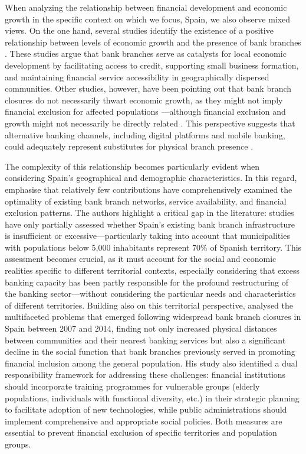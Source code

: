 \documentclass[a4paper,11pt,oneside]{article}
\begin{document}
When analyzing the relationship between financial development and economic growth in the specific context on which we focus, Spain, we also observe mixed views. On the one hand, several studies identify the existence of a positive relationship between levels of economic growth and the presence of bank branches  \citep[see, for instance,][]{olit2011exclusion,fernandez2019banks,alonso2020dinamicas}. These studies argue that bank branches serve as catalysts for local economic development by facilitating access to credit, supporting small business formation, and maintaining financial service accessibility in geographically dispersed communities. Other studies, however, have been pointing out that bank branch closures do not necessarily thwart economic growth, as they might not imply financial exclusion for affected populations \citep{maudos2017bank,jimenez2018cierre,garcia2021}---although financial exclusion and growth might not necessarily be directly related \citep{koku2015financial}. This perspective suggests that alternative banking channels, including digital platforms and mobile banking, could adequately represent substitutes for physical branch presence \citep{philippon2019fintech}.




The complexity of this relationship becomes particularly evident when considering Spain's geographical and demographic characteristics. In this regard, \cite{alama_conesa_forte_tortosa_jas} emphasise that relatively few contributions have comprehensively examined the optimality of existing bank branch networks, service availability, and financial exclusion patterns. The authors highlight a critical gap in the literature: studies have only partially assessed whether Spain's existing bank branch infrastructure is insufficient or excessive---particularly taking into account that municipalities with populations below 5,000 inhabitants represent 70\% of Spanish territory. This assessment becomes crucial, as it must account for the social and economic realities specific to different territorial contexts, especially considering that excess banking capacity has been partly responsible for the profound restructuring of the banking sector---without considering the particular needs and characteristics of different territories. Building also on this territorial perspective, \cite{martin2019financial} analysed the multifaceted problems that emerged following widespread bank branch closures in Spain between 2007 and 2014, finding not only increased physical distances between communities and their nearest banking services but also a significant decline in the social function that bank branches previously served in promoting financial inclusion among the general population. His study also identified a dual responsibility framework for addressing these challenges: financial institutions should incorporate training programmes for vulnerable groups (elderly populations, individuals with functional diversity, etc.) in their strategic planning to facilitate adoption of new technologies, while public administrations should implement comprehensive and appropriate social policies. Both measures are essential to prevent financial exclusion of specific territories and population groups.
\end{document}
